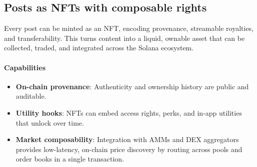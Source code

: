 \documentclass[10pt]{article}
\begin{document}
    \subsection{Posts as NFTs with composable rights}\label{sec:posts_as_nft}
      Every post can be minted as an NFT, encoding provenance, streamable royalties, and transferability. This turns content into a liquid, ownable asset that can be collected, traded, and integrated across the Solana ecosystem.

      \paragraph{Capabilities}
        \begin{itemize}[leftmargin=*]
          \item \textbf{On-chain provenance}: Authenticity and ownership history are public and auditable.
          \item \textbf{Utility hooks}: NFTs can embed access rights, perks, and in-app utilities that unlock over time.
          \item \textbf{Market composability}: Integration with AMMs and DEX aggregators provides low-latency, on-chain price discovery by routing across pools and order books in a single transaction.
        \end{itemize}
\end{document}
